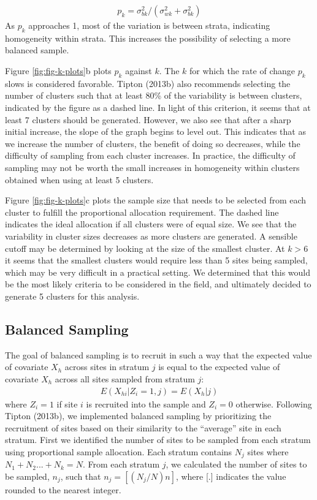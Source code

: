 \documentclass[
  english,
  man,floatsintext]{apa6}
\begin{document}
\begin{align} \label{eq:pk}
p_k = \sigma_{bk}^2/(\sigma_{wk}^2 + \sigma_{bk}^2)
\end{align}
As \(p_k\) approaches 1, most of the variation is between strata, indicating homogeneity within strata. This increases the possibility of selecting a more balanced sample.

Figure \ref{fig:fig-k-plots}b plots \(p_k\) against \(k\). The \(k\) for which the rate of change \(p_k\) slows is considered favorable. Tipton (2013b) also recommends selecting the number of clusters such that at least 80\% of the variability is between clusters, indicated by the figure as a dashed line. In light of this criterion, it seems that at least 7 clusters should be generated. However, we also see that after a sharp initial increase, the slope of the graph begins to level out. This indicates that as we increase the number of clusters, the benefit of doing so decreases, while the difficulty of sampling from each cluster increases. In practice, the difficulty of sampling may not be worth the small increases in homogeneity within clusters obtained when using at least 5 clusters.

Figure \ref{fig:fig-k-plots}c plots the sample size that needs to be selected from each cluster to fulfill the proportional allocation requirement. The dashed line indicates the ideal allocation if all clusters were of equal size. We see that the variability in cluster sizes decreases as more clusters are generated. A sensible cutoff may be determined by looking at the size of the smallest cluster. At \(k > 6\) it seems that the smallest clusters would require less than 5 sites being sampled, which may be very difficult in a practical setting. We determined that this would be the most likely criteria to be considered in the field, and ultimately decided to generate 5 clusters for this analysis.

\hypertarget{balanced-sampling}{%
\subsection{Balanced Sampling}\label{balanced-sampling}}

The goal of balanced sampling is to recruit in such a way that the expected value of covariate \(X_h\) across sites in stratum \(j\) is equal to the expected value of covariate \(X_h\) across all sites sampled from stratum \(j\):
\begin{align}
E(X_{hi}|Z_i = 1, j) = E(X_h|j)
\end{align}
where \(Z_i = 1\) if site \(i\) is recruited into the sample and \(Z_i = 0\) otherwise. Following Tipton (2013b), we implemented balanced sampling by prioritizing the recruitment of sites based on their similarity to the \enquote{average} site in each stratum. First we identified the number of sites to be sampled from each stratum using proportional sample allocation. Each stratum contains \(N_j\) sites where \(N_1 + N_2 ... + N_k = N\). From each stratum \(j\), we calculated the number of sites to be sampled, \(n_j\), such that \(n_j = [(N_j/N)n]\), where {[}.{]} indicates the value rounded to the nearest integer.
\end{document}
